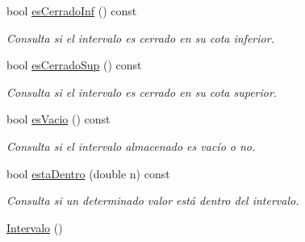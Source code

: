 \begin{DoxyCompactItemize}
bool \hyperlink{classIntervalo_a6737cfbda201a3a6e11a716d2568d322}{es\+Cerrado\+Inf} () const 
\begin{DoxyCompactList}\small\item\em Consulta si el intervalo es cerrado en su cota inferior. \end{DoxyCompactList}\item 
bool \hyperlink{classIntervalo_ad0c5573ee88ffbfda8f78454b78d91a6}{es\+Cerrado\+Sup} () const 
\begin{DoxyCompactList}\small\item\em Consulta si el intervalo es cerrado en su cota superior. \end{DoxyCompactList}\item 
bool \hyperlink{classIntervalo_ab53adad27de8ec98cf8f4280bd3a7df9}{es\+Vacio} () const 
\begin{DoxyCompactList}\small\item\em Consulta si el intervalo almacenado es vacío o no. \end{DoxyCompactList}\item 
bool \hyperlink{classIntervalo_af55ac0bb47855ef909402e2ec76cda5b}{esta\+Dentro} (double n) const 
\begin{DoxyCompactList}\small\item\em Consulta si un determinado valor está dentro del intervalo. \end{DoxyCompactList}\item 
\hyperlink{classIntervalo_a9b5b23dda7ee26b444898457959cb03d}{Intervalo} ()\hypertarget{classIntervalo_a9b5b23dda7ee26b444898457959cb03d}{}\label{classIntervalo_a9b5b23dda7ee26b444898457959cb03d}


\end{DoxyCompactItemize}
